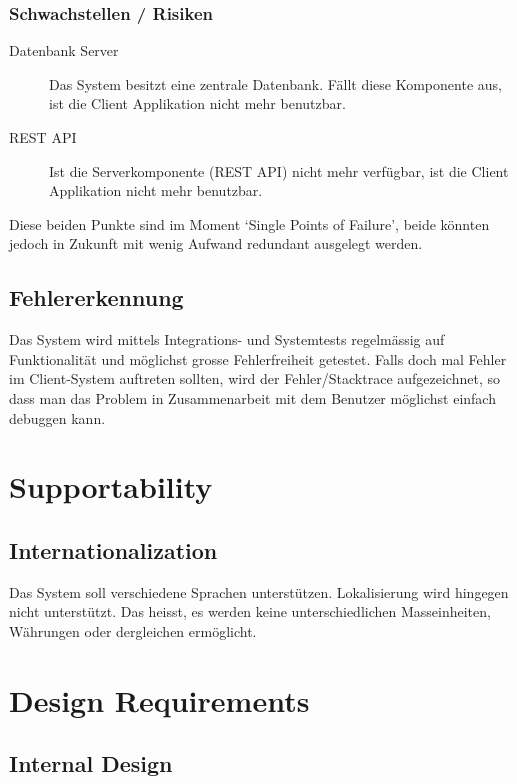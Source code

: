 \documentclass[10pt,a4paper]{scrartcl}
\begin{document}
		\subsubsection{Schwachstellen / Risiken}

		\begin{description}
			\item[Datenbank Server]
				Das System besitzt eine zentrale Datenbank. Fällt diese Komponente aus, ist die Client Applikation nicht mehr benutzbar.
			\item[REST API]
				Ist die Serverkomponente (REST API) nicht mehr verfügbar, ist die Client Applikation nicht mehr benutzbar.
		\end{description}

		Diese beiden Punkte sind im Moment `Single Points of Failure', beide könnten jedoch in Zukunft mit wenig Aufwand redundant ausgelegt werden.

	\subsection{Fehlererkennung}

	Das System wird mittels Integrations- und Systemtests regelmässig auf Funktionalität und möglichst grosse Fehlerfreiheit getestet.
	Falls doch mal Fehler im Client-System auftreten sollten, wird der Fehler/Stacktrace aufgezeichnet, so dass man das Problem in Zusammenarbeit mit dem Benutzer möglichst einfach debuggen kann.


\section{Supportability}

	\subsection{Internationalization}

	Das System soll verschiedene Sprachen unterstützen. Lokalisierung wird hingegen nicht unterstützt. Das heisst, es werden keine unterschiedlichen Masseinheiten, Währungen oder dergleichen ermöglicht.


\section{Design Requirements}

	\subsection{Internal Design}
\end{document}
